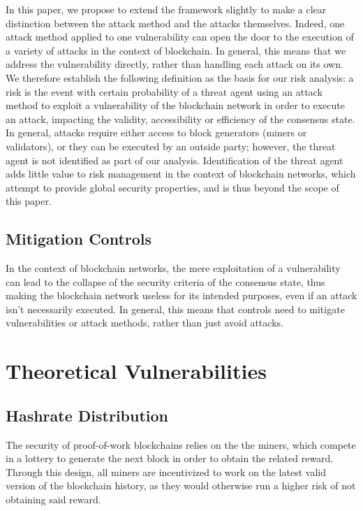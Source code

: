 \documentclass[11pt,a4paper]{article}
\begin{document}
In this paper, we propose to extend the framework slightly to make a clear distinction between the attack method and the attacks themselves. Indeed, one attack method applied to one vulnerability can open the door to the execution of a variety of attacks in the context of blockchain. In general, this means that we address the vulnerability directly, rather than handling each attack on its own.\\

We therefore establish the following definition as the basis for our risk analysis: a risk is the event with certain probability of a threat agent using an attack method to exploit a vulnerability of the blockchain network in order to execute an attack, impacting the validity, accessibility or efficiency of the consensus state.\\

In general, attacks require either access to block generators (miners or validators), or they can be executed by an outside party; however, the threat agent is not identified as part of our analysis. Identification of the threat agent adds little value to risk management in the context of blockchain networks, which attempt to provide global security properties, and is thus beyond the scope of this paper.\\

\subsection{Mitigation Controls}

In the context of blockchain networks, the mere exploitation of a vulnerability can lead to the collapse of the security criteria of the consensus state, thus making the blockchain network useless for its intended purposes, even if an attack isn't necessarily executed. In general, this means that controls need to mitigate vulnerabilities or attack methods, rather than just avoid attacks.\\

\section{Theoretical Vulnerabilities}

\subsection{Hashrate Distribution}

The security of proof-of-work blockchains relies on the the miners, which compete in a lottery to generate the next block in order to obtain the related reward. Through this design, all miners are incentivized to work on the latest valid version of the blockchain history, as they would otherwise run a higher risk of not obtaining said reward.\\
\end{document}
